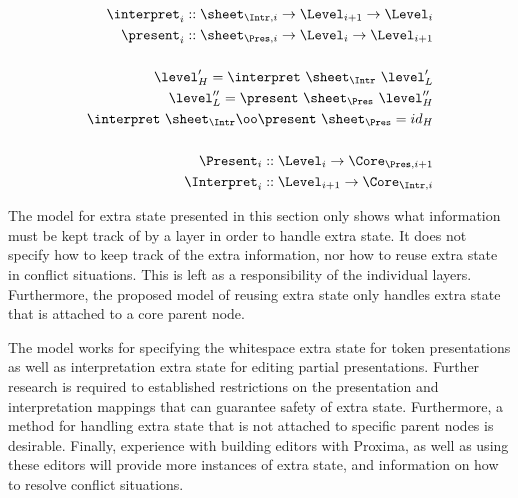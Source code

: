 \begin{small}\begin{align*}%
\interpret_{i} :: \sheet_{\Intr,i} \rightarrow \Level_{i+1} \rightarrow \Level_{i}\\
\present_{i} :: \sheet_{\Pres,i}  \rightarrow  \Level_{i} \rightarrow \Level_{i+1}\\
\\
\level'_{H} = \interpret~\sheet_{\Intr}~\level'_{L}\\
\level''_{L} = \present~\sheet_{\Pres}~\level''_{H}\\
\interpret~\sheet_{\Intr}  \oo \present~\sheet_{\Pres} = id_{H}\\
\\
\Present_{i} :: \Level_{i} \rightarrow \Core_{\Pres,i+1}\\
\Interpret_{i} :: \Level_{i+1} \rightarrow \Core_{\Intr,i}\\
\end{align*} 
\end{small}
\center{()}
\ec


The model for extra state presented in this section only shows what information must be kept track of by a layer in order to handle extra state. It does not specify how to keep track of the extra information, nor how to reuse extra state in conflict situations. This is left as a responsibility of the individual layers. Furthermore, the proposed model of reusing extra state only handles extra state that is attached to a core parent node.  

The model works for specifying the whitespace extra state for token presentations as well as interpretation extra state for editing partial presentations. Further research is required to established restrictions on the presentation and interpretation mappings that can guarantee safety of extra state. Furthermore, a method for handling extra state that is not attached to specific parent nodes is desirable.  Finally, experience with building editors with Proxima, as well as using these editors will provide more instances of extra state, and information on how to resolve conflict situations.

